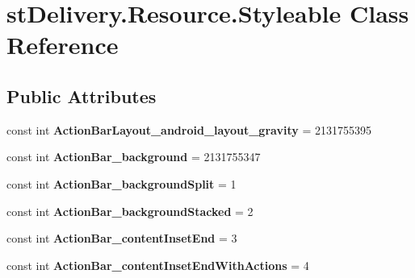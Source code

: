 \hypertarget{classst_delivery_1_1_resource_1_1_styleable}{}\section{st\+Delivery.\+Resource.\+Styleable Class Reference}
\label{classst_delivery_1_1_resource_1_1_styleable}
\subsection*{Public Attributes}
\begin{DoxyCompactItemize}
\item 
\mbox{\label{classst_delivery_1_1_resource_1_1_styleable_aadbe9ea9c3573b7155402b0f76a50f0c}} 
const int {\bfseries Action\+Bar\+Layout\+\_\+android\+\_\+layout\+\_\+gravity} = 2131755395
\item 
\mbox{\label{classst_delivery_1_1_resource_1_1_styleable_a1e4b630d87ddc0001b72bf2fe6f3d3b6}} 
const int {\bfseries Action\+Bar\+\_\+background} = 2131755347
\item 
\mbox{\label{classst_delivery_1_1_resource_1_1_styleable_a7f7d4836bb1fa35f23995e573a77627f}} 
const int {\bfseries Action\+Bar\+\_\+background\+Split} = 1
\item 
\mbox{\label{classst_delivery_1_1_resource_1_1_styleable_a3643ffd4d948f5073435a61b4507a296}} 
const int {\bfseries Action\+Bar\+\_\+background\+Stacked} = 2
\item 
\mbox{\label{classst_delivery_1_1_resource_1_1_styleable_adc221d8b9f78b26d1255824470219261}} 
const int {\bfseries Action\+Bar\+\_\+content\+Inset\+End} = 3
\item 
\mbox{\label{classst_delivery_1_1_resource_1_1_styleable_a128399eac7ae80b1b5f23521e522a0e6}} 
const int {\bfseries Action\+Bar\+\_\+content\+Inset\+End\+With\+Actions} = 4
\item 
\mbox{\label{classst_delivery_1_1_resource_1_1_styleable_aac4675fe1e372453ec5b60ab8a5b1c35}} 

\end{DoxyCompactItemize}
